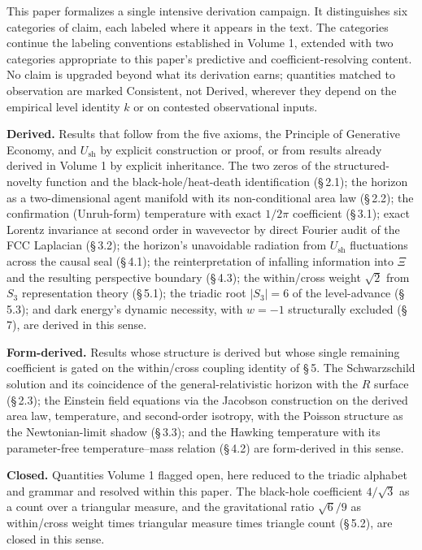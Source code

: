 \documentclass[11pt,oneside]{report}
\theoremstyle{definition}
\theoremstyle{remark}
\begin{document}
This paper formalizes a single intensive derivation campaign. It
distinguishes six categories of claim, each labeled where it appears in
the text. The categories continue the labeling conventions established in
Volume 1, extended with two categories appropriate to this paper's
predictive and coefficient-resolving content. No claim is upgraded beyond
what its derivation earns; quantities matched to observation are marked
Consistent, not Derived, wherever they depend on the empirical level
identity \ensuremath{k} or on contested observational inputs.

\textbf{Derived.} Results that follow from the five axioms, the Principle
of Generative Economy, and \ensuremath{U_{\mathrm{sh}}} by explicit
construction or proof, or from results already derived in Volume 1 by
explicit inheritance. The two zeros of the structured-novelty function
and the black-hole/heat-death identification (\S\,2.1); the horizon as a
two-dimensional agent manifold with its non-conditional area law (\S\,2.2);
the confirmation (Unruh-form) temperature with exact
\ensuremath{1/2\pi} coefficient (\S\,3.1); exact Lorentz invariance at
second order in wavevector by direct Fourier audit of the FCC Laplacian
(\S\,3.2); the horizon's unavoidable radiation from
\ensuremath{U_{\mathrm{sh}}} fluctuations across the causal seal (\S\,4.1);
the reinterpretation of infalling information into \ensuremath{\Xi} and
the resulting perspective boundary (\S\,4.3); the within/cross weight
\ensuremath{\sqrt{2}} from \ensuremath{S_3} representation theory (\S\,5.1);
the triadic root \ensuremath{|S_3| = 6} of the level-advance (\S\,5.3); and
dark energy's dynamic necessity, with \ensuremath{w = -1} structurally
excluded (\S\,7), are derived in this sense.

\textbf{Form-derived.} Results whose structure is derived but whose
single remaining coefficient is gated on the within/cross coupling
identity of \S\,5. The Schwarzschild solution and its coincidence of the
general-relativistic horizon with the \ensuremath{\hat{R}} surface
(\S\,2.3); the Einstein field equations via the Jacobson construction on
the derived area law, temperature, and second-order isotropy, with the
Poisson structure as the Newtonian-limit shadow (\S\,3.3); and the Hawking
temperature with its parameter-free temperature--mass relation (\S\,4.2)
are form-derived in this sense.

\textbf{Closed.} Quantities Volume 1 flagged open, here reduced to the
triadic alphabet and grammar and resolved within this paper. The
black-hole coefficient \ensuremath{4/\sqrt{3}} as a count over a
triangular measure, and the gravitational ratio \ensuremath{\sqrt{6}/9} as
within/cross weight times triangular measure times triangle count
(\S\,5.2), are closed in this sense.
\end{document}
